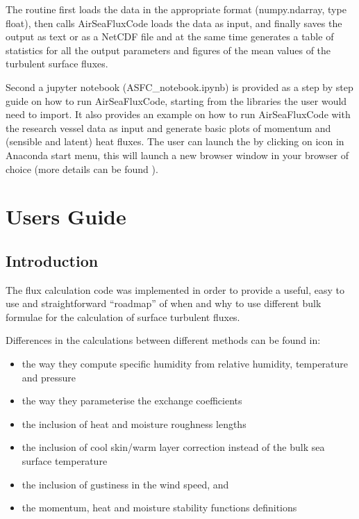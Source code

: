 \documentclass[letterpaper,10pt,english]{sphinxmanual}
\begin{document}
\sphinxAtStartPar
The routine first loads the data in the appropriate format (numpy.ndarray, type float), then calls AirSeaFluxCode loads the data as input, and finally saves the output as  text or as a NetCDF file and at the same time generates a table of statistics for all the output parameters and figures of the mean values of the turbulent surface fluxes.

\sphinxAtStartPar
Second a jupyter notebook (ASFC\_notebook.ipynb) is provided as a step by step guide on how to run AirSeaFluxCode, starting from the libraries the user would need to import. It also provides an example on how to run AirSeaFluxCode with the research vessel data as input and generate basic plots of momentum and (sensible and latent) heat fluxes. The user can launch the  by clicking on  icon in Anaconda start menu, this will launch a new browser window in your browser of choice (more details can be found ).

\sphinxstepscope


\chapter{Users Guide}
\label{\detokenize{users_guide:users-guide}}\label{\detokenize{users_guide::doc}}

\section{Introduction}
\label{\detokenize{users_guide:introduction}}
\sphinxAtStartPar
The flux calculation code was implemented in order to provide a useful, easy to use and straightforward “roadmap” of when and why to use different bulk formulae for the calculation of surface turbulent fluxes.

\sphinxAtStartPar
Differences in the calculations between different methods can be found in:
\begin{itemize}
\item {}
\sphinxAtStartPar
the way they compute specific humidity from relative humidity, temperature and pressure

\item {}
\sphinxAtStartPar
the way they parameterise the exchange coefficients

\item {}
\sphinxAtStartPar
the inclusion of heat and moisture roughness lengths

\item {}
\sphinxAtStartPar
the inclusion of cool skin/warm layer correction instead of the bulk sea surface temperature

\item {}
\sphinxAtStartPar
the inclusion of gustiness in the wind speed, and

\item {}
\sphinxAtStartPar
the momentum, heat and moisture stability functions definitions

\end{itemize}
\end{document}
